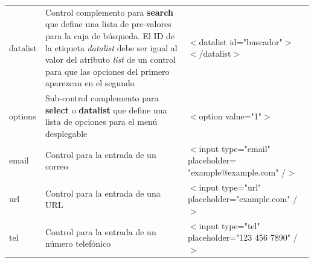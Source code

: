 \begin{table}[H]
\begin{center}
\begin{tabular}{m{2.5cm} m{7cm} m{5cm}}
            datalist        & Control complemento para \textbf{search} que define una lista de pre-valores para la caja de búsqueda. El ID de la etiqueta \textit{datalist} debe ser igual al valor del atributo \textit{list} de un control para que las opciones del primero aparezcan en el segundo                                     & \parbox{5cm}{$<$datalist id="buscador"$>$ \\ $<$/datalist$>$} \\
            options         & Sub-control complemento para \textbf{select} o \textbf{datalist} que define una lista de opciones para el menú desplegable    & $<$option value="1"$>$ \\
            email           & Control para la entrada de un correo                                                                                          & \parbox{5cm}{$<$input type="email" \\ placeholder= \\ "example@example.com" /$>$} \\
            url             & Control para la entrada de una URL                                                                                            & \parbox{5cm}{$<$input type="url" \\ placeholder="example.com" /$>$} \\
            tel             & Control para la entrada de un número telefónico                                                                               & \parbox{5cm}{$<$input type="tel" \\ placeholder="123 456 7890" /$>$} \\
            \hline
        \end{tabular}
    \end{center}
\end{table}

